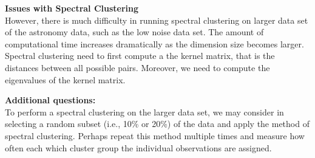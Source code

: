 \documentclass[english,11pt]{article}
\begin{document}
\textbf{Issues with Spectral Clustering}\\
However, there is much difficulty in running spectral clustering on larger data set of the astronomy data, such as the low noise data set. The amount of computational time increases dramatically as the dimension size becomes larger. Spectral clustering need to first compute a the kernel matrix, that is the distances between all possible pairs. Moreover, we need to compute the eigenvalues of the kernel matrix. 

\textbf{Additional questions:}\\
To perform a spectral clustering on the larger data set, we may consider in selecting a random subset (i.e., 10\% or 20\%) of the data and apply the method of spectral clustering. Perhaps repeat this method multiple times and measure how often each which cluster group the individual observations are assigned. 
 
\end{document}
